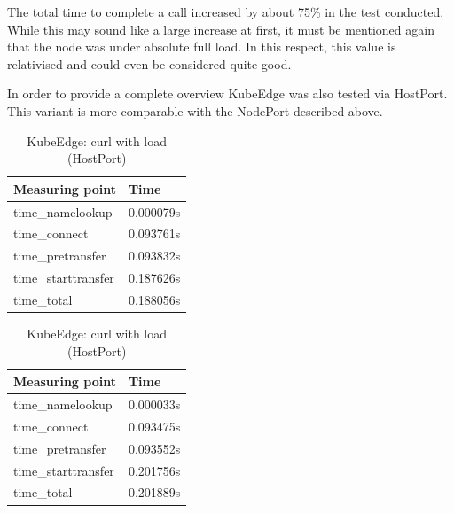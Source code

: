 \documentclass[MIC,Master,english]{twbook}%
\begin{document}
The total time to complete a call increased by about 75\% in the test conducted. While this may sound like a large increase at first, it must be mentioned again that the node was under absolute full load. In this respect, this value is relativised and could even be considered quite good.

In order to provide a complete overview KubeEdge was also tested via HostPort. This variant is more comparable with the NodePort described above.

\begin{table}[ht]
    \begin{center}
        \begin{minipage}{.49\linewidth}
            \begin{center}
                \begin{tabular}{|l|l|}
                    \hline
                    Measuring point & Time \\
                    \hline
                    time\_namelookup & 0.000079s \\
                    time\_connect & 0.093761s \\
                    time\_pretransfer & 0.093832s \\
                    time\_starttransfer & 0.187626s \\
                    \hline
                    time\_total & 0.188056s \\
                    \hline
                \end{tabular}
                \caption{KubeEdge: curl no load (HostPort)}
                \label{tab:ke-con-noload-np}
            \end{center}
        \end{minipage}
        \begin{minipage}{.49\linewidth}
            \begin{center}
                \begin{tabular}{|l|l|}
                    \hline
                    Measuring point & Time \\
                    \hline
                    time\_namelookup & 0.000033s \\
                    time\_connect & 0.093475s \\
                    time\_pretransfer & 0.093552s \\
                    time\_starttransfer & 0.201756s \\
                    \hline
                    time\_total & 0.201889s \\
                    \hline
                \end{tabular}
                \caption{KubeEdge: curl with load (HostPort)}
                \label{tab:ke-con-load-np}
            \end{center}
        \end{minipage}
    \end{center}
\end{table}
\end{document}
